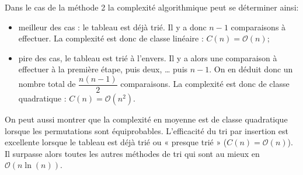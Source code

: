 \documentclass[10pt,fleqn]{article} %
\begin{document}


Dans le cas de la méthode 2 la complexité algorithmique peut se déterminer ainsi: 
\begin{itemize}
\item meilleur des cas : le tableau est déjà trié. Il y a donc $n - 1$ comparaisons à effectuer. La complexité est donc de classe linéaire : $C(n)=\mathcal{O}(n)$;
\item pire des cas, le tableau est trié à l'envers. Il y a alors une comparaison à effectuer à la première étape, puis deux, … puis $n-1$. On en déduit donc un nombre total de $\dfrac{n\left(n-1\right)}{2}$  comparaisons. La complexité est donc de classe quadratique : $C(n)=\mathcal{O}\left(n^2\right)$.

\end{itemize}



\begin{rem}
On peut aussi montrer que la complexité en moyenne est de classe quadratique lorsque les permutations sont équiprobables. L'efficacité du tri par insertion est excellente lorsque le tableau est déjà trié ou « presque trié » ($C(n)=\mathcal{O}\left(n\right)$). Il surpasse alors toutes les autres méthodes de tri qui sont au mieux en $\mathcal{O}\left(n \ln(n)\right)$.
\end{rem}





\end{document}
